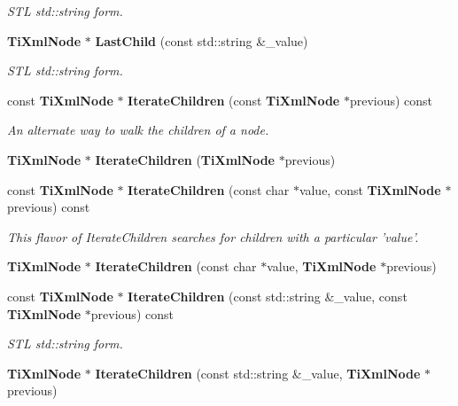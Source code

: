 \begin{CompactItemize}
\begin{CompactList}\small\item\em STL std::string form. \item\end{CompactList}\item 
{\bf Ti\-Xml\-Node} $\ast$ {\bf Last\-Child} (const std::string \&\_\-value)\label{classTiXmlNode_TiXmlUnknowna25}

\begin{CompactList}\small\item\em STL std::string form. \item\end{CompactList}\item 
const {\bf Ti\-Xml\-Node} $\ast$ {\bf Iterate\-Children} (const {\bf Ti\-Xml\-Node} $\ast$previous) const
\begin{CompactList}\small\item\em An alternate way to walk the children of a node. \item\end{CompactList}\item 
{\bf Ti\-Xml\-Node} $\ast$ {\bf Iterate\-Children} ({\bf Ti\-Xml\-Node} $\ast$previous)\label{classTiXmlNode_TiXmlUnknowna27}

\item 
const {\bf Ti\-Xml\-Node} $\ast$ {\bf Iterate\-Children} (const char $\ast$value, const {\bf Ti\-Xml\-Node} $\ast$previous) const\label{classTiXmlNode_TiXmlUnknowna28}

\begin{CompactList}\small\item\em This flavor of Iterate\-Children searches for children with a particular 'value'. \item\end{CompactList}\item 
{\bf Ti\-Xml\-Node} $\ast$ {\bf Iterate\-Children} (const char $\ast$value, {\bf Ti\-Xml\-Node} $\ast$previous)\label{classTiXmlNode_TiXmlUnknowna29}

\item 
const {\bf Ti\-Xml\-Node} $\ast$ {\bf Iterate\-Children} (const std::string \&\_\-value, const {\bf Ti\-Xml\-Node} $\ast$previous) const\label{classTiXmlNode_TiXmlUnknowna30}

\begin{CompactList}\small\item\em STL std::string form. \item\end{CompactList}\item 
{\bf Ti\-Xml\-Node} $\ast$ {\bf Iterate\-Children} (const std::string \&\_\-value, {\bf Ti\-Xml\-Node} $\ast$previous)\label{classTiXmlNode_TiXmlUnknowna31}


\end{CompactItemize}
